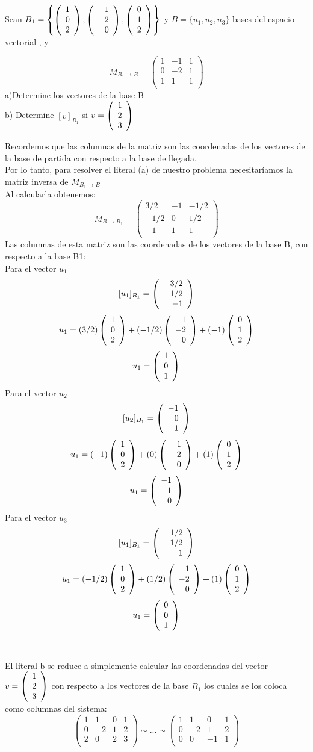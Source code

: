 \begin{ejercicio}
Sean $B_1= \left\{\left( \begin{array}{r} 1\\ 0\\ 2 \end{array} \right) , \left( \begin{array}{r} 1\\ -2\\ 0 \end{array} \right) , \left( \begin{array}{r} 0\\ 1\\ 2 \end{array} \right)  \right\} $ y $B=\{u_1, u_2, u_3\}$ bases del espacio vectorial \rtres, y 

\[M_{B_1 \rightarrow B}=\left(\begin{array}{rrr}
1&-1&1\\
0&-2&1\\
1&1&1\\
\end{array}\right)\]
a)Determine los vectores de la base B
~\\b) Determine $[v]_{B_1}$ si $v=\left( \begin{array}{r} 1\\ 2\\ 3 \end{array} \right) $

\sol
Recordemos que las columnas de la matriz son las coordenadas de los vectores de la base de partida con respecto a la base de llegada.~\\
Por lo tanto, para resolver el literal (a) de nuestro problema necesitaríamos la matriz inversa de $M_{B_1 \rightarrow B}$~\\
Al calcularla obtenemos:~\\

\[M_{B \rightarrow B_1}=\left(\begin{array}{rrr}
3/2&-1&-1/2\\
-1/2&0&1/2\\
-1&1&1\\
\end{array}\right)\]
Las columnas de esta matriz son las coordenadas de los vectores de la base B, con respecto a la base B1:
~\\
Para el vector $u_1$~\\
$$[u_1]_{B_1}=\left( \begin{array}{r} 3/2\\ -1/2\\ -1 \end{array} \right) $$
$$u_1=(3/2)\left( \begin{array}{r} 1\\ 0\\ 2 \end{array} \right) +(-1/2)\left( \begin{array}{r} 1\\ -2\\ 0 \end{array} \right) +(-1)\left( \begin{array}{r} 0\\ 1\\ 2 \end{array} \right) $$
$$u_1=\left( \begin{array}{r} 1\\ 0\\ 1 \end{array} \right) $$
Para el vector $u_2$~\\
$$[u_2]_{B_1}=\left( \begin{array}{r} -1\\ 0\\ 1 \end{array} \right) $$
$$u_1=(-1)\left( \begin{array}{r} 1\\ 0\\ 2 \end{array} \right) +(0)\left( \begin{array}{r} 1\\ -2\\ 0 \end{array} \right) +(1)\left( \begin{array}{r} 0\\ 1\\ 2 \end{array} \right) $$
$$u_1=\left( \begin{array}{r} -1\\ 1\\ 0 \end{array} \right) $$
Para el vector $u_3$~\\
$$[u_1]_{B_1}=\left( \begin{array}{r} -1/2\\ 1/2\\ 1 \end{array} \right) $$
$$u_1=(-1/2)\left( \begin{array}{r} 1\\ 0\\ 2 \end{array} \right) +(1/2)\left( \begin{array}{r} 1\\ -2\\ 0 \end{array} \right) +(1)\left( \begin{array}{r} 0\\ 1\\ 2 \end{array} \right) $$
$$u_1=\left( \begin{array}{r} 0\\ 0\\ 1 \end{array} \right) $$
~\\
~\\
El literal b se reduce a simplemente calcular las coordenadas del vector $v=\left( \begin{array}{r} 1\\ 2\\ 3 \end{array} \right) $ con respecto a los vectores de la base $B_1$ los cuales se los coloca como columnas del sistema:
\[\left(\begin{array}{rrr|r}
1&1&0&1\\
0&-2&1&2\\
2&0&2&3\\
\end{array}\right)
\sim...\sim
\left(\begin{array}{rrr|r}
1&1&0&1\\
0&-2&1&2\\
0&0&-1&1\\
\end{array}\right)
\]


\end{ejercicio}
